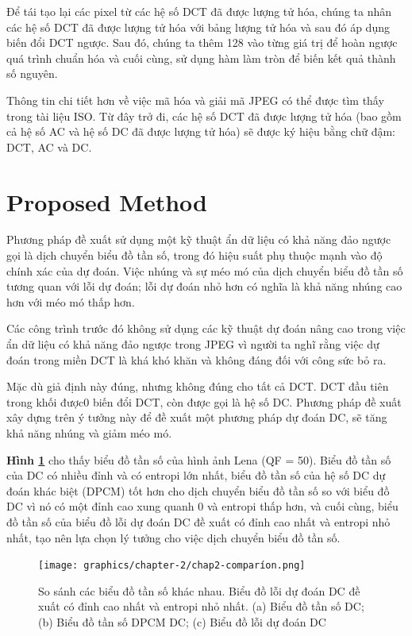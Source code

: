 Để tái tạo lại các pixel từ các hệ số DCT đã được lượng tử hóa, chúng ta nhân các hệ số DCT đã được lượng tử hóa với bảng lượng tử hóa và sau đó áp dụng biến đổi DCT ngược. Sau đó, chúng ta thêm 128 vào từng giá trị để hoàn ngược quá trình chuẩn hóa và cuối cùng, sử dụng hàm làm tròn để biến kết quả thành số nguyên. 

Thông tin chi tiết hơn về việc mã hóa và giải mã JPEG có thể được tìm thấy trong tài liệu ISO. Từ đây trở đi, các hệ số DCT đã được lượng tử hóa (bao gồm cả hệ số AC và hệ số DC đã được lượng tử hóa) sẽ được ký hiệu bằng chữ đậm: DCT, AC và DC. 

\section{Proposed Method}
Phương pháp đề xuất sử dụng một kỹ thuật ẩn dữ liệu có khả năng đảo ngược gọi là dịch chuyển biểu đồ tần số, trong đó hiệu suất phụ thuộc mạnh vào độ chính xác của dự đoán. Việc nhúng và sự méo mó của dịch chuyển biểu đồ tần số tương quan với lỗi dự đoán; lỗi dự đoán nhỏ hơn có nghĩa là khả năng nhúng cao hơn với méo mó thấp hơn. 

Các công trình trước đó không sử dụng các kỹ thuật dự đoán nâng cao trong việc ẩn dữ liệu có khả năng đảo ngược trong JPEG vì người ta nghĩ rằng việc dự đoán trong miền DCT là khá khó khăn và không đáng đối với công sức bỏ ra.  

Mặc dù giả định này đúng, nhưng không đúng cho tất cả DCT. DCT đầu tiên trong khối được0 biến đổi DCT, còn được gọi là hệ số DC. Phương pháp đề xuất xây dựng trên ý tưởng này để đề xuất một phương pháp dự đoán DC, sẽ tăng khả năng nhúng và giảm méo mó. 

\textbf{Hình \ref{fig:chap2-comparíon}} cho thấy biểu đồ tần số của hình ảnh Lena (QF = 50). Biểu đồ tần số của DC có nhiều đỉnh và có entropi lớn nhất, biểu đồ tần số của hệ số DC dự đoán khác biệt (DPCM) tốt hơn cho dịch chuyển biểu đồ tần số so với biểu đồ DC vì nó có một đỉnh cao xung quanh 0 và entropi thấp hơn, và cuối cùng, biểu đồ tần số của biểu đồ lỗi dự đoán DC đề xuất có đỉnh cao nhất và entropi nhỏ nhất, tạo nên lựa chọn lý tưởng cho việc dịch chuyển biểu đồ tần số. 

\begin{figure}
    \centering
    \texttt{[image: graphics/chapter-2/chap2-comparíon.png]}
    \caption{So sánh các biểu đồ tần số khác nhau. Biểu đồ lỗi dự đoán DC đề xuất có đỉnh cao nhất và entropi nhỏ nhất. (a) Biểu đồ tần số DC; (b) Biểu đồ tần số DPCM DC; (c) Biểu đồ lỗi dự đoán DC}
    \label{fig:chap2-comparíon}
\end{figure}

